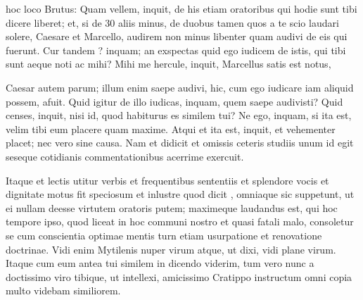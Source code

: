  hoc loco Brutus: Quam vellem, inquit, de his etiam oratoribus qui hodie sunt tibi dicere liberet; et, si de 30 aliis minus, de duobus tamen quos a te scio laudari solere, Caesare et Marcello, audirem non minus libenter quam audivi de eis qui fuerunt. Cur tandem ? inquam; an exspectas quid ego iudicem de istis, qui tibi sunt aeque noti ac mihi? Mihi me hercule, inquit, Marcellus satis est notus,

 Caesar autem parum; illum enim saepe audivi, hic, cum ego iudicare iam aliquid possem, afuit. Quid igitur de illo iudicas, inquam, quem saepe audivisti? Quid censes, inquit, nisi id, quod habiturus es similem tui? Ne ego, inquam, si ita est, velim tibi eum placere quam maxime. Atqui et ita est, inquit, et vehementer placet; nec vero sine causa. Nam et didicit et omissis ceteris studiis unum id egit seseque cotidianis commentationibus acerrime exercuit.

 Itaque et lectis utitur verbis et frequentibus sententiis et splendore vocis et dignitate motus fit speciosum et inlustre quod dicit , omniaque sic suppetunt, ut ei nullam deesse virtutem oratoris putem; maximeque laudandus est, qui hoc tempore ipso, quod liceat in hoc communi nostro et quasi fatali malo, consoletur se cum conscientia optimae mentis turn etiam usurpatione et renovatione doctrinae. Vidi enim Mytilenis nuper virum atque, ut dixi, vidi plane virum. Itaque cum eum antea tui similem in dicendo viderim, tum vero nunc a doctissimo viro tibique, ut intellexi, amicissimo Cratippo instructum omni copia multo videbam similiorem.

